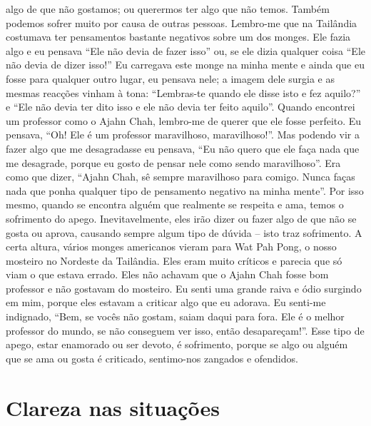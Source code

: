 algo de que não gostamos; ou querermos ter algo que não
temos.
Também podemos sofrer muito por causa de outras pessoas. Lembro-me que na Tailândia costumava ter pensamentos bastante negativos sobre um dos monges. Ele fazia algo e
eu pensava “Ele não devia de fazer isso” ou, se ele dizia qualquer coisa “Ele não devia de dizer isso!” Eu carregava este
monge na minha mente e ainda que eu fosse para qualquer
outro lugar, eu pensava nele; a imagem dele surgia e as mesmas reacções vinham à tona: “Lembras-te quando ele disse
isto e fez aquilo?” e “Ele não devia ter dito isso e ele não
devia ter feito aquilo”.
Quando encontrei um professor como o Ajahn Chah,
lembro-me de querer que ele fosse perfeito. Eu pensava, “Oh!
Ele é um professor maravilhoso, maravilhoso!”. Mas podendo
vir a fazer algo que me desagradasse eu pensava, “Eu não
quero que ele faça nada que me desagrade, porque eu gosto
de pensar nele como sendo maravilhoso”. Era como que
dizer, “Ajahn Chah, sê sempre maravilhoso para comigo.
Nunca faças nada que ponha qualquer tipo de pensamento
negativo na minha mente”. Por isso mesmo, quando se encontra alguém que realmente se respeita e ama, temos o sofrimento do apego. Inevitavelmente, eles irão dizer ou fazer
algo de que não se gosta ou aprova, causando sempre algum
tipo de dúvida – isto traz sofrimento.
A certa altura, vários monges americanos vieram para
Wat Pah Pong, o nosso mosteiro no Nordeste da Tailândia.
Eles eram muito críticos e parecia que só viam o que estava
errado. Eles não achavam que o Ajahn Chah fosse bom professor e não gostavam do mosteiro. Eu senti uma grande raiva
e ódio surgindo em mim, porque eles estavam a criticar algo
que eu adorava. Eu senti-me indignado, “Bem, se vocês não
gostam, saiam daqui para fora. Ele é o melhor professor do
mundo, se não conseguem ver isso, então desapareçam!”.
Esse tipo de apego, estar enamorado ou ser devoto, é sofrimento, porque se algo ou alguém que se ama ou gosta é criticado, sentimo-nos zangados e ofendidos.

\section{Clareza nas situações}

